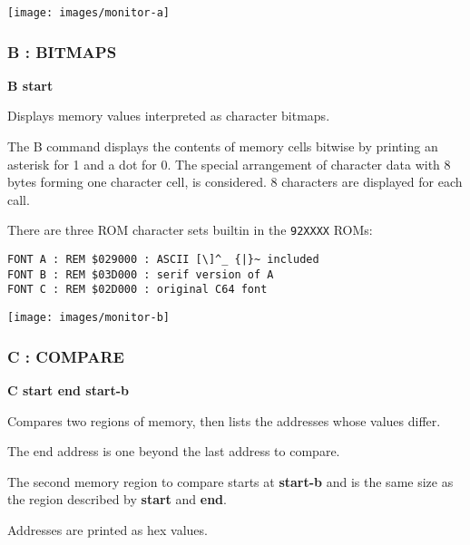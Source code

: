 \texttt{[image: images/monitor-a]}


\subsubsection{B : BITMAPS}

\begin{description}[leftmargin=2cm,style=nextline]
\item [Format:] {\bf B start}
\item [Usage:] Displays memory values interpreted as character bitmaps.

\item [Remarks:] The B command displays the contents of memory cells bitwise
                 by printing an asterisk for 1 and a dot for 0.
                 The special arrangement of character data with 8 bytes
                 forming one character cell, is considered.
                 8 characters are displayed for each call.

                 There are three ROM character sets builtin
                 in the {\tt 92XXXX} ROMs:

\begin{tcolorbox}[colback=blue,coltext=white]
\verbatimfont{\codefont}
\begin{verbatim}
FONT A : REM $029000 : ASCII [\]^_ {|}~ included
FONT B : REM $03D000 : serif version of A
FONT C : REM $02D000 : original C64 font
\end{verbatim}
\end{tcolorbox}
\end{description}
\texttt{[image: images/monitor-b]}


\subsubsection{C : COMPARE}
\begin{description}[leftmargin=2cm,style=nextline]
\item [Format:] {\bf C start end start-b}
\item [Usage:] Compares two regions of memory, then lists the addresses whose values differ.

\item [Remarks:] The end address is one beyond the last address to compare.

    The second memory region to compare starts at {\bf start-b} and is the same size as the region described by {\bf start} and {\bf end}.

    Addresses are printed as hex values.

\end{description}

